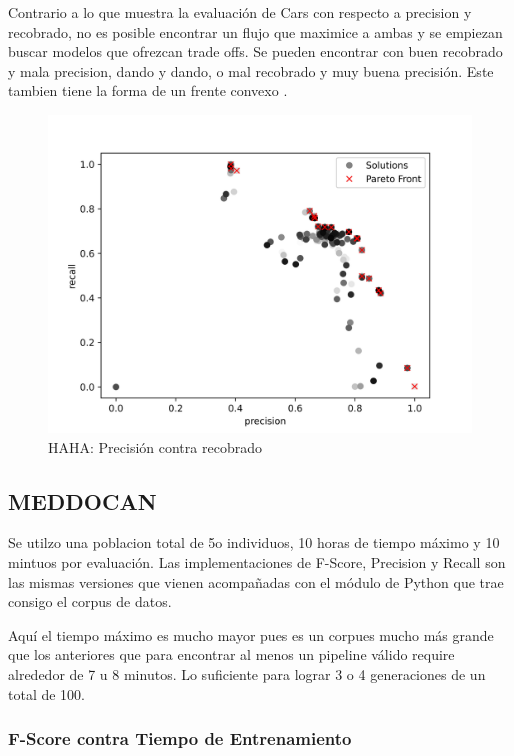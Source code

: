 Contrario a lo que muestra la evaluaci\'on de Cars con respecto a precision y recobrado, no es posible encontrar un flujo que maximice a ambas y se empiezan buscar modelos que ofrezcan trade offs. Se pueden encontrar con buen recobrado y mala precision, dando y dando, o mal recobrado y muy buena precisi\'on. Este tambien tiene la forma de un frente convexo .

\begin{figure}[ht]
    \includegraphics[width=\linewidth]{Pictures/haha_precision_vs_recall.jpg}
    \caption{HAHA: Precisi\'on contra recobrado}
    \label{impl:fig:HAHA:precision_vs_recall}
\end{figure}

\subsection{MEDDOCAN}

Se utilzo una poblacion total de 5o individuos, 10 horas de tiempo m\'aximo y 10 mintuos por  evaluaci\'on. Las implementaciones de F-Score, Precision y Recall son las mismas versiones que vienen acompa\~nadas con el m\'odulo de Python que trae consigo el corpus de datos.

Aqu\'i el tiempo m\'aximo es mucho mayor pues es un corpues mucho m\'as grande que los anteriores que para encontrar al menos un pipeline v\'alido require alrededor de 7 u 8 minutos. Lo suficiente para lograr 3 o 4 generaciones de un total de 100.


\subsubsection{F-Score contra Tiempo de Entrenamiento}


